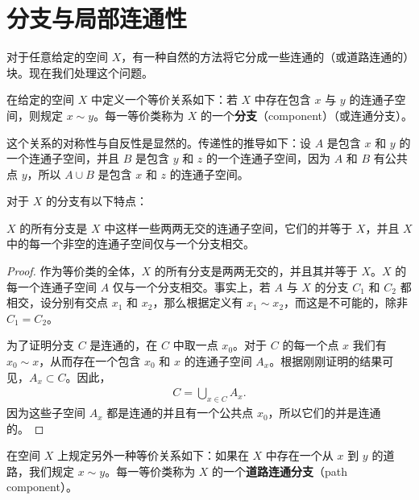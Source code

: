 \section{分支与局部连通性}\label{section:ch03-components-locally-connected}

对于任意给定的空间 $X$，有一种自然的方法将它分成一些连通的（或道路连通的）块。现在我们处理这个问题。

\begin{definition}\label{definition:ch03-component}
在给定的空间 $X$ 中定义一个等价关系如下：若 $X$ 中存在包含 $x$ 与 $y$ 的连通子空间，则规定 $x\sim y$。每一等价类称为 $X$ 的一个\textbf{分支}（component）（或连通分支）。
\end{definition}

这个关系的对称性与自反性是显然的。传递性的推导如下：设 $A$ 是包含 $x$ 和 $y$ 的一个连通子空间，并且 $B$ 是包含 $y$ 和 $z$ 的一个连通子空间，因为 $A$ 和 $B$ 有公共点 $y$，所以 $A\cup B$ 是包含 $x$ 和 $z$ 的连通子空间。

对于 $X$ 的分支有以下特点：

\begin{theorem}\label{theorem:ch03-components-partition}
$X$ 的所有分支是 $X$ 中这样一些两两无交的连通子空间，它们的并等于 $X$，并且 $X$ 中的每一个非空的连通子空间仅与一个分支相交。
\end{theorem}

\begin{proof}
作为等价类的全体，$X$ 的所有分支是两两无交的，并且其并等于 $X$。$X$ 的每一个连通子空间 $A$ 仅与一个分支相交。事实上，若 $A$ 与 $X$ 的分支 $C_{1}$ 和 $C_{2}$ 都相交，设分别有交点 $x_{1}$ 和 $x_{2}$，那么根据定义有 $x_{1}\sim x_{2}$，而这是不可能的，除非 $C_{1}=C_{2}$。

为了证明分支 $C$ 是连通的，在 $C$ 中取一点 $x_{0}$。对于 $C$ 的每一个点 $x$ 我们有 $x_{0}\sim x$，从而存在一个包含 $x_{0}$ 和 $x$ 的连通子空间 $A_{x}$。根据刚刚证明的结果可见，$A_{x}\subset C$。因此，
\begin{align*}
C=\bigcup_{x\in C}A_{x}.
\end{align*}
因为这些子空间 $A_{x}$ 都是连通的并且有一个公共点 $x_{0}$，所以它们的并是连通的。
\end{proof}

\begin{definition}\label{definition:ch03-path-component}
在空间 $X$ 上规定另外一种等价关系如下：如果在 $X$ 中存在一个从 $x$ 到 $y$ 的道路，我们规定 $x\sim y$。每一等价类称为 $X$ 的一个\textbf{道路连通分支}（path component）。
\end{definition}

